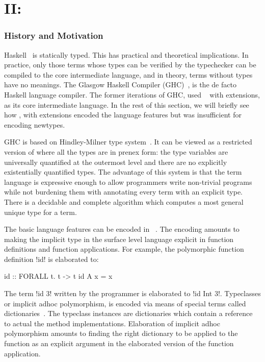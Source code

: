 \documentclass[screen,nonacm,manuscript,review]{acmart} %
\begin{document}
\part{II: \SFC}\label{part:II}
\section{History and Motivation}
Haskell~\cite{haskell_2010} is statically typed.
This has practical and theoretical implications.
In practice, only those terms whose types can be verified by the
typechecker can be compiled to the core intermediate language, and in theory,
terms without types have no meanings.
The Glasgow Haskell Compiler (GHC)~\cite{ghc_2020}, is the de facto
Haskell language compiler. The former iterations of GHC,
used \SF~\cite{girard_proofs_1989, reynolds_towards_1974} with extensions,
as its core intermediate language. In the
rest of this section, we will briefly see how \SF, with extensions
encoded the language features but was insufficient for encoding newtypes.

GHC is based on Hindley-Milner type system~\cite{milner_theory_1978}.
It can be viewed as a restricted version of \SF where all the types
are in prenex form: the type variables
are universally quantified at the outermost level and there are no
explicitly existentially quantified types.
The advantage of this system is that the term language
is expressive enough to allow programmers write non-trivial programs
while not burdening them with annotating every term with an explicit
type. There is a decidable and complete algorithm
which computes a most general unique type for a term.

The basic language features can be encoded in \SF~\cite{burstall_hope_1980}.
The encoding amounts to making the implicit type in the surface level language
explicit in function definitions and function applications.
For example, the polymorphic function definition !id! is elaborated to:

\begin{CenteredBox}
\begin{code}
id :: FORALL t. t -> t
id A x = x
\end{code}
\end{CenteredBox}

The term !id 3! written by the programmer is elaborated to !id Int 3!.
Typeclasses or implicit adhoc polymorphism, is encoded via means of
special terms called dictionaries~\cite{wadler_polymorphism_1989, hall_type_1994}.
The typeclass instances are dictionaries which contain a reference
to actual the method implementations.
Elaboration of implicit adhoc polymorphism amounts to finding
the right dictionary to be applied to the function as an explicit
argument in the elaborated version of the function application.
\end{document}
